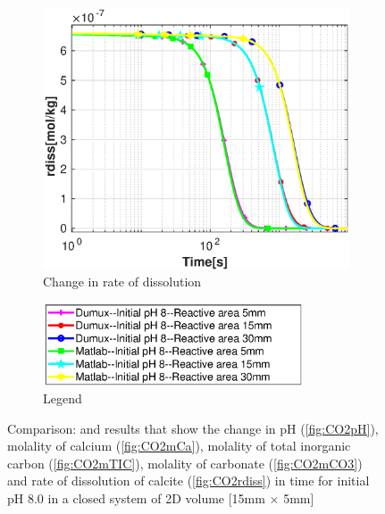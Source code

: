 \begin{figure}
\begin{subfigure}{.5\linewidth}
    \end{subfigure}%
    \hfill
    \begin{subfigure}{.5\linewidth}
            \centering
        \includegraphics[width=\textwidth]{PICTURES/dvm_pH8_rdiss.eps}
        \caption{Change in rate of dissolution}
        \label{fig:dvmpH8rdiss}
    \end{subfigure}%
   \hfill
   \begin{subfigure}{.5\linewidth}
            \centering
        \includegraphics[width=0.85\textwidth]{PICTURES/dvm_pH8_legend.eps}
        \caption{Legend}
        \label{fig:dvmpH8legend}
    \end{subfigure}%
   \caption{Comparison: \DuMuX and \MATLAB results that show the change in pH (\cref{fig:CO2pH}), 
   molality of calcium (\cref{fig:CO2mCa}), molality of total inorganic carbon (\cref{fig:CO2mTIC}), 
   molality of carbonate (\cref{fig:CO2mCO3}) and rate of dissolution of calcite (\cref{fig:CO2rdiss}) 
   in time for initial pH 8.0 in a closed system of 2D volume [15mm $\times$ 5mm]} 
    \label{fig:comparisionDumuxMatlab_pH8.0}
\end{figure}
   
